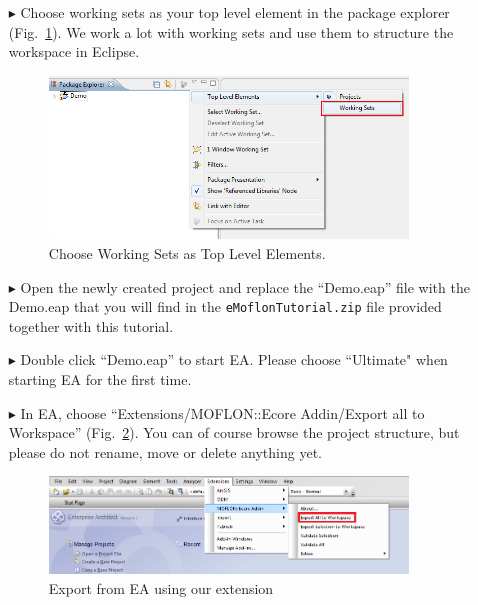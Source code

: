 \begin{enumerate}
\item[$\blacktriangleright$] Choose working sets as your top level element in
the package explorer (Fig.~\ref{fig_eclipseWorkingsets}).
We work a lot with working sets and use them to structure the workspace in
Eclipse.
\begin{figure}[htbp]
	\centering
  \includegraphics[width=0.9\textwidth]{pics/installationAndSetup/eclipse_workingsets.png}
	\caption{Choose Working Sets as Top Level Elements.}
	\label{fig_eclipseWorkingsets}
\end{figure}

\item[$\blacktriangleright$] Open the newly created project and replace the
``Demo.eap'' file with the Demo.eap that you will find in the
\texttt{eMoflonTutorial.zip} file provided together with this tutorial. 

\item[$\blacktriangleright$] Double click ``Demo.eap'' to start EA.
Please choose ``Ultimate" when starting EA for the first time.

\item[$\blacktriangleright$] In EA, choose ``Extensions/MOFLON::Ecore Addin/Export
all to Workspace'' (Fig.~\ref{fig_ea}).  You can of course browse the project
structure, but please do not rename, move or delete anything yet.
\begin{figure}[htbp]
	\centering
  \includegraphics[width=0.9\textwidth]{pics/installationAndSetup/ea_firststart}
	\caption{Export from EA using our extension} 
	\label{fig_ea} 
\end{figure}


\end{enumerate}
